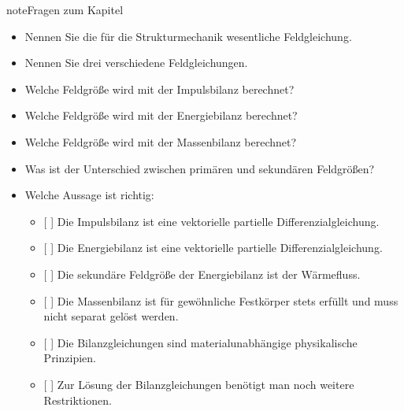 \documentclass[letterpaper,10pt,german]{jupyterBook}
\begin{document}
\begin{sphinxadmonition}{note}{Fragen zum Kapitel}

\sphinxAtStartPar
{}
\begin{itemize}
\item {} 
\sphinxAtStartPar
Nennen Sie die für die Strukturmechanik wesentliche Feldgleichung.

\item {} 
\sphinxAtStartPar
Nennen Sie drei verschiedene Feldgleichungen.

\item {} 
\sphinxAtStartPar
Welche Feldgröße wird mit der Impulsbilanz berechnet?

\item {} 
\sphinxAtStartPar
Welche Feldgröße wird mit der Energiebilanz berechnet?

\item {} 
\sphinxAtStartPar
Welche Feldgröße wird mit der Massenbilanz berechnet?

\item {} 
\sphinxAtStartPar
Was ist der Unterschied zwischen primären und sekundären Feldgrößen?

\item {} 
\sphinxAtStartPar
Welche Aussage ist richtig:
\begin{itemize}
\item {} 
\sphinxAtStartPar
{[} {]} Die Impulsbilanz ist eine vektorielle partielle Differenzialgleichung.

\item {} 
\sphinxAtStartPar
{[} {]} Die Energiebilanz ist eine vektorielle partielle Differenzialgleichung.

\item {} 
\sphinxAtStartPar
{[} {]} Die sekundäre Feldgröße der Energiebilanz ist der Wärmefluss.

\item {} 
\sphinxAtStartPar
{[} {]} Die Massenbilanz ist für gewöhnliche Festkörper stets erfüllt und muss nicht separat gelöst werden.

\item {} 
\sphinxAtStartPar
{[} {]} Die Bilanzgleichungen sind materialunabhängige physikalische Prinzipien.

\item {} 
\sphinxAtStartPar
{[} {]} Zur Lösung der Bilanzgleichungen benötigt man noch weitere Restriktionen.

\end{itemize}


\end{itemize}
\end{sphinxadmonition}
\end{document}
